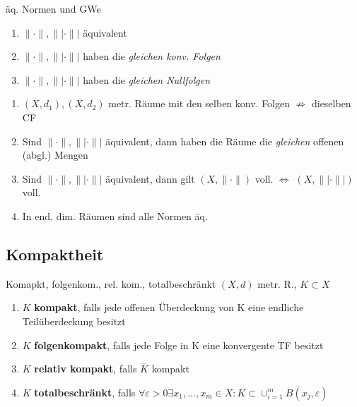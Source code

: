 \begin{satz}{äq. Normen und GWe}
  \begin{enumerate}[label = $\Leftrightarrow$]
    \item $\|\cdot\|, \||\cdot\||$ äquivalent
    \item $\|\cdot\|, \||\cdot\||$ haben die \textit{gleichen konv. Folgen}
    \item $\|\cdot\|, \||\cdot\||$ haben die \textit{gleichen Nullfolgen}
  \end{enumerate}
\end{satz}

\begin{bemerkung}

  \begin{enumerate}[label = (\roman*)]
    \item $(X,d_1),(X,d_2)$ metr. Räume mit den selben konv. Folgen
      $\not\Rightarrow$ dieselben CF
    \item Sind $\|\cdot\|, \||\cdot\||$ äquivalent, dann haben die Räume die
      \textit{gleichen} offenen (abgl.) Mengen
    \item Sind $\|\cdot\|, \||\cdot\||$ äquivalent, dann gilt
      $(X,\|\cdot\|)$ voll. $\Leftrightarrow$ $(X,\||\cdot\||)$ voll.
    \item In end. dim. Räumen sind alle Normen äq.
  \end{enumerate}
\end{bemerkung}



\subsection{Kompaktheit}

\begin{definition}{Komapkt, folgenkom., rel. kom., totalbeschränkt}
  $(X,d)$ metr. R., $K \subset X$
  \begin{enumerate}[label = (\roman*)]
    \item $K$ \textbf{kompakt}, falls jede offenen Überdeckung von K eine
      endliche Teilüberdeckung besitzt
    \item $K$ \textbf{folgenkompakt}, falls jede Folge in K eine konvergente TF
      besitzt
    \item $K$ \textbf{relativ kompakt}, falls $\overline{K}$ kompakt
    \item $K$ \textbf{totalbeschränkt}, falls
      $\forall \varepsilon >0 \exists x_1,...,x_m \in X:
      K \subset \cup_{i=1}^{m}B(x_j,\varepsilon) $
  \end{enumerate}
\end{definition}

